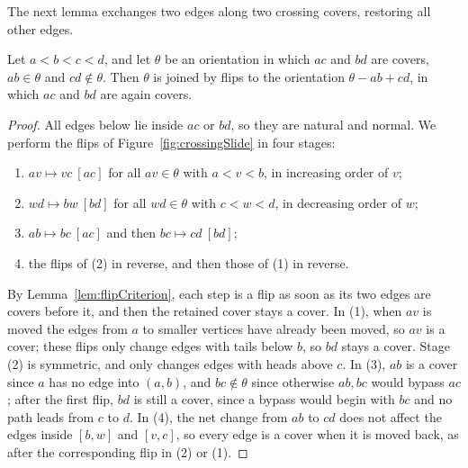 The next lemma exchanges two edges along two crossing covers, restoring all
other edges.

\begin{lemma}\label{lem:crossingSlide}
Let $a<b<c<d$, and let $\theta$ be an orientation in which $ac$ and $bd$ are
covers, $ab\in\theta$ and $cd\notin\theta$.
Then $\theta$ is joined by flips to the orientation $\theta-ab+cd$, in which $ac$
and $bd$ are again covers.
\end{lemma}

\begin{proof}
All edges below lie inside $ac$ or $bd$, so they are natural and normal.
We perform the flips of Figure~\ref{fig:crossingSlide} in four stages:
\begin{enumerate}[(1)]
\item $av\mapsto vc\ [ac]$ for all $av\in\theta$ with $a<v<b$, in increasing order of $v$;
\item $wd\mapsto bw\ [bd]$ for all $wd\in\theta$ with $c<w<d$, in decreasing order of $w$;
\item $ab\mapsto bc\ [ac]$ and then $bc\mapsto cd\ [bd]$;
\item the flips of (2) in reverse, and then those of (1) in reverse.
\end{enumerate}
By Lemma~\ref{lem:flipCriterion}, each step is a flip as soon as its two edges
are covers before it, and then the retained cover stays a cover.
In (1), when $av$ is moved the edges from $a$ to smaller vertices have already
been moved, so $av$ is a cover; these flips only change edges with tails below
$b$, so $bd$ stays a cover.
Stage (2) is symmetric, and only changes edges with heads above $c$.
In (3), $ab$ is a cover since $a$ has no edge into $(a,b)$, and $bc\notin\theta$
since otherwise $ab,bc$ would bypass $ac$; after the first flip, $bd$ is still a
cover, since a bypass would begin with $bc$ and no path leads from $c$ to $d$.
In (4), the net change from $ab$ to $cd$ does not affect the edges inside
$[b,w]$ and $[v,c]$, so every edge is a cover when it is moved back, as after
the corresponding flip in (2) or (1).
\end{proof}

